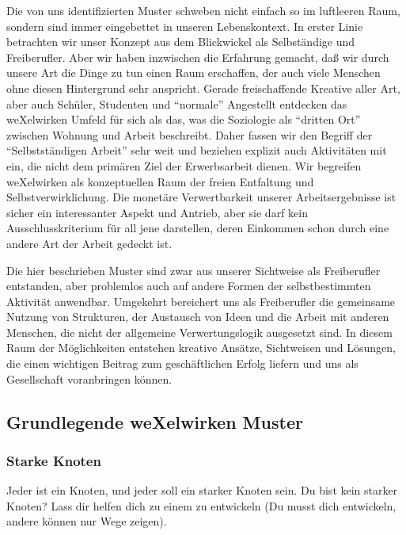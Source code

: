 Die von uns identifizierten Muster schweben nicht einfach so im luftleeren Raum, sondern sind immer eingebettet  in  unseren  Lebenskontext.
%
In  erster  Linie  betrachten  wir  unser  Konzept  aus  dem Blickwickel als Selbständige und Freiberufler.
%
Aber wir haben inzwischen die Erfahrung gemacht, daß wir durch unsere Art die Dinge zu tun einen Raum erschaffen, der auch viele Menschen ohne diesen 
Hintergrund sehr anspricht.
%
Gerade freischaffende Kreative aller Art, aber auch Schüler, Studenten und "`normale"' Angestellt entdecken das weXelwirken Umfeld für sich als das, was die Soziologie als "`dritten Ort"' zwischen Wohnung und Arbeit beschreibt.
%
Daher fassen wir den Begriff der "`Selbstständigen Arbeit"' sehr weit und beziehen explizit auch Aktivitäten mit ein, die nicht dem primären Ziel der Erwerbsarbeit dienen.
%
Wir begreifen weXelwirken als konzeptuellen Raum der freien Entfaltung und Selbstverwirklichung.
%
Die monetäre Verwertbarkeit unserer  Arbeitsergebnisse  ist  sicher  ein  interessanter  Aspekt  und  Antrieb,  aber  sie  darf  kein 
Ausschlusskriterium für all jene darstellen, deren Einkommen schon durch eine andere Art der Arbeit gedeckt ist.
%



Die hier beschrieben Muster sind zwar aus unserer Sichtweise als Freiberufler entstanden, aber problemlos auch auf andere Formen der selbstbestimmten Aktivität anwendbar. 
%
Umgekehrt bereichert uns als Freiberufler die gemeinsame Nutzung von Strukturen, der Austausch von Ideen und die Arbeit mit anderen Menschen, die nicht der allgemeine Verwertungslogik ausgesetzt sind.
%
In diesem Raum der Möglichkeiten entstehen kreative Ansätze, Sichtweisen und Lösungen, die einen wichtigen Beitrag zum geschäftlichen Erfolg liefern und uns als Gesellschaft voranbringen können.


\subsection{Grundlegende weXelwirken Muster}

\subsubsection{Starke Knoten}
Jeder ist ein Knoten, und jeder soll ein starker Knoten sein.
%
Du bist kein starker Knoten?
%
Lass dir helfen dich zu einem zu entwickeln (Du musst dich entwickeln, andere können nur Wege zeigen).

